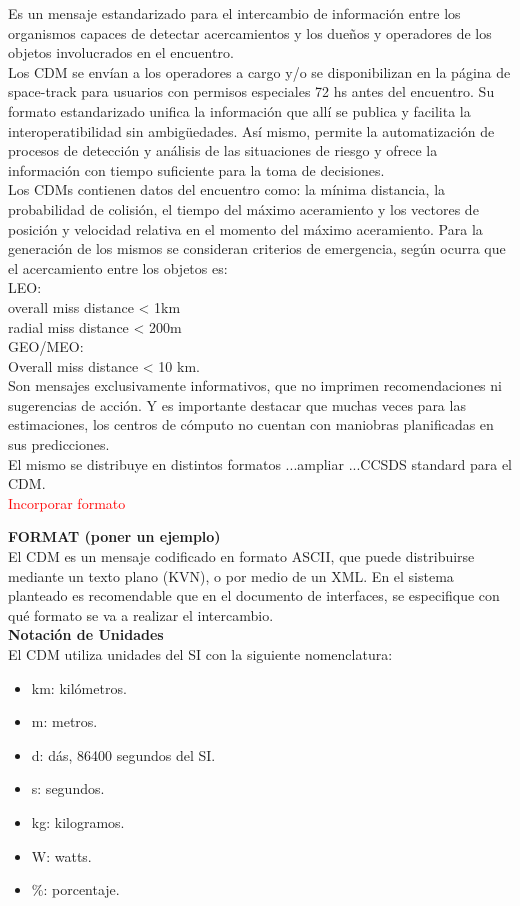Es un mensaje estandarizado para el intercambio de informaci\'on entre los organismos capaces de detectar acercamientos y los due\~nos y operadores de los objetos involucrados en el encuentro.\\
Los CDM se env\'ian a los operadores a cargo y/o se disponibilizan en la p\'agina de space-track para usuarios con permisos especiales 72 hs antes del encuentro.
Su formato estandarizado unifica la informaci\'on que all\'i se publica y facilita la interoperatibilidad sin ambig\"{u}edades. As\'i mismo, permite la automatizaci\'on de procesos de detecci\'on y an\'alisis de las situaciones de riesgo y ofrece la informaci\'on con tiempo suficiente para la toma de decisiones.\\

Los CDMs contienen datos del encuentro como: la m\'inima distancia, la probabilidad de colisi\'on, el tiempo del m\'aximo aceramiento y los vectores de posici\'on y velocidad relativa en el momento del m\'aximo aceramiento.
Para la generaci\'on de los mismos se consideran criterios de emergencia, seg\'un ocurra que el acercamiento entre los objetos es:\\

LEO:\\
overall miss distance < 1km\\
radial miss distance < 200m\\
GEO/MEO:\\
Overall miss distance < 10 km.\\

Son mensajes exclusivamente informativos, que no imprimen recomendaciones ni sugerencias de acci\'on.
Y es importante destacar que muchas veces para las estimaciones, los centros de c\'omputo no cuentan con maniobras planificadas en sus predicciones.\\ 

El mismo se distribuye en distintos formatos ...ampliar ...CCSDS standard para el CDM. \\
\textcolor{red}{Incorporar formato}

{\bf{FORMAT (poner un ejemplo)}}\\
El CDM es un mensaje codificado en formato ASCII, que puede distribuirse mediante un texto plano (KVN), o por medio de un XML. 
En el sistema planteado es recomendable que en el documento de interfaces, se especifique con qu\'e formato se va a realizar el intercambio.\\
{\bf{Notaci\'on de Unidades}}\\
El CDM utiliza unidades del \ac{SI} con la siguiente nomenclatura:\\
\begin{itemize}
 \item km: kil\'ometros.
 \item m: metros.
 \item d: d\'as, 86400 segundos del SI.
 \item s: segundos.
 \item kg: kilogramos.
 \item W: watts.
 \item \%: porcentaje.
\end{itemize}

